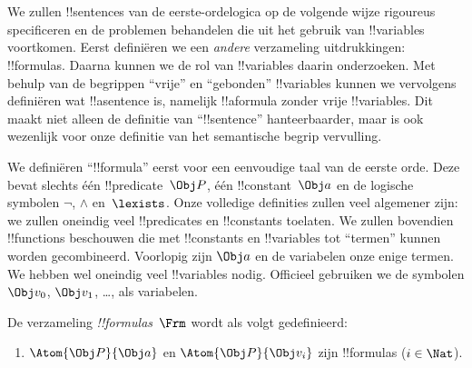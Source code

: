 \documentclass[openany]{memoir}
\begin{document}
\begingroup
\def\olfilename{OLP-0142}
\def\olfilepath{content/first-order-logic/introduction/}
\hypertarget{unit-OLP-0142}{}




\section{}

We zullen !!{sentence}s van de eerste-ordelogica op de volgende wijze
rigoureus specificeren en de problemen behandelen die uit het gebruik
van !!{variable}s voortkomen. Eerst definiëren we een \emph{andere}
verzameling uitdrukkingen: !!{formula}s. Daarna kunnen we de rol van
!!{variable}s daarin onderzoeken. Met behulp van de begrippen
``vrije'' en ``gebonden'' !!{variable}s kunnen we vervolgens definiëren
wat !!a{sentence} is, namelijk !!a{formula} zonder vrije
!!{variable}s. Dit maakt niet alleen de definitie van ``!!{sentence}''
hanteerbaarder, maar is ook wezenlijk voor onze definitie van het
semantische begrip vervulling.

We definiëren ``!!{formula}'' eerst voor een eenvoudige taal van de
eerste orde. Deze bevat slechts één !!{predicate}~$\Obj P$, één
!!{constant}~$\Obj a$ en de logische symbolen $\lnot$, $\land$
en~$\lexists$. Onze volledige definities zullen veel algemener zijn:
we zullen oneindig veel !!{predicate}s en !!{constant}s toelaten. We
zullen bovendien !!{function}s beschouwen die met !!{constant}s en
!!{variable}s tot ``termen'' kunnen worden gecombineerd. Voorlopig zijn
$\Obj a$ en de variabelen onze enige termen. We hebben wel oneindig
veel !!{variable}s nodig. Officieel gebruiken we de symbolen
$\Obj v_0$, $\Obj v_1$, \dots, als variabelen.

\begin{defn}
De verzameling \emph{!!{formula}s}~$\Frm$ wordt als volgt gedefinieerd:
\begin{enumerate}
\item{} $\Atom{\Obj P}{\Obj a}$ en $\Atom{\Obj
  P}{\Obj v_i}$ zijn !!{formula}s ($i \in \Nat$).




\end{enumerate}
\end{defn}
\end{document}

